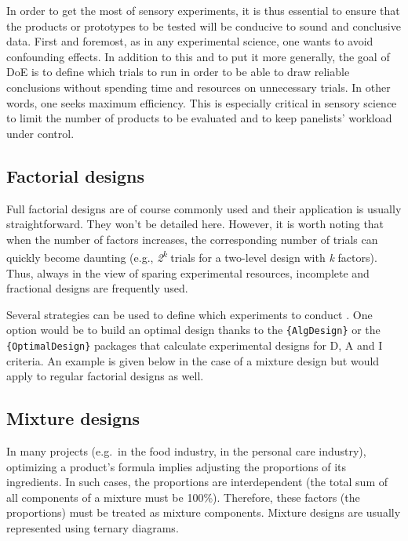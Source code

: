 \documentclass[
]{krantz}
\begin{document}
In order to get the most of sensory experiments, it is thus essential to ensure that the products or prototypes to be tested will be conducive to sound and conclusive data. First and foremost, as in any experimental science, one wants to avoid confounding effects. In addition to this and to put it more generally, the goal of DoE is to define which trials to run in order to be able to draw reliable conclusions without spending time and resources on unnecessary trials. In other words, one seeks maximum efficiency. This is especially critical in sensory science to limit the number of products to be evaluated and to keep panelists' workload under control.

\hypertarget{factorial-designs}{%
\subsection{Factorial designs}\label{factorial-designs}}

Full factorial designs are of course commonly used and their application is usually straightforward. They won't be detailed here. However, it is worth noting that when the number of factors increases, the corresponding number of trials can quickly become daunting (e.g., \emph{2\textsuperscript{k}} trials for a two-level design with \emph{k} factors). Thus, always in the view of sparing experimental resources, incomplete and fractional designs are frequently used.

Several strategies can be used to define which experiments to conduct \citep[\citet{Lawson2014}, \citet{Rasch2011}]{Dean2017}. One option would be to build an optimal design thanks to the \texttt{\{AlgDesign\}} or the \texttt{\{OptimalDesign\}} packages that calculate experimental designs for D, A and I criteria. An example is given below in the case of a mixture design but would apply to regular factorial designs as well.

\hypertarget{mixture-designs}{%
\subsection{Mixture designs}\label{mixture-designs}}

In many projects (e.g.~in the food industry, in the personal care industry), optimizing a product's formula implies adjusting the proportions of its ingredients. In such cases, the proportions are interdependent (the total sum of all components of a mixture must be 100\%). Therefore, these factors (the proportions) must be treated as mixture components. Mixture designs are usually represented using ternary diagrams.
\end{document}
